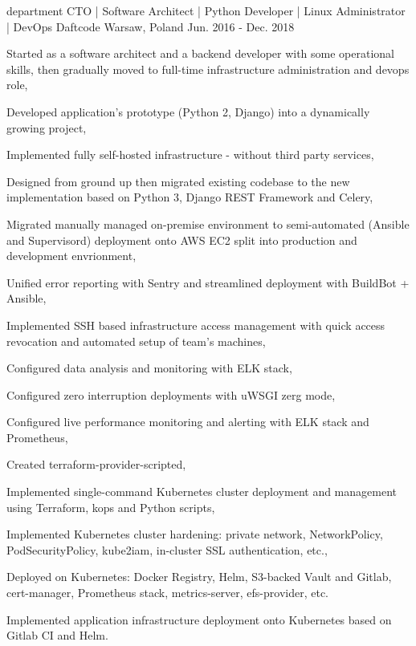 \begin{cventries}
    \cventry
    {department CTO | Software Architect | Python Developer | Linux Administrator | DevOps} %
    {Daftcode} %
    {Warsaw, Poland} %
    {Jun. 2016 - Dec. 2018} %
    {
        \begin{cvitems} %
            \item {Started as a software architect and a backend developer with some operational skills, then gradually moved to full-time infrastructure administration and devops role,}
            \item {Developed application's prototype (Python 2, Django) into a dynamically growing project,}
            \item {Implemented fully self-hosted infrastructure - without third party services,}
            \item {Designed from ground up then migrated existing codebase to the new implementation based on Python 3, Django REST Framework and Celery,}
            \item {Migrated manually managed on-premise environment to semi-automated (Ansible and Supervisord) deployment onto AWS EC2 split into production and development envrionment,}
            \item {Unified error reporting with Sentry and streamlined deployment with BuildBot + Ansible,}
            \item {Implemented SSH based infrastructure access management with quick access revocation and automated setup of team's machines,}
            \item {Configured data analysis and monitoring with ELK stack,}
            \item {Configured zero interruption deployments with uWSGI zerg mode,}
            \item {Configured live performance monitoring and alerting with ELK stack and Prometheus,}
            \item {Created terraform-provider-scripted,}
            \item {Implemented single-command Kubernetes cluster deployment and management using Terraform, kops and Python scripts,}
            \item {Implemented Kubernetes cluster hardening: private network, NetworkPolicy, PodSecurityPolicy, kube2iam, in-cluster SSL authentication, etc.,}
            \item {Deployed on Kubernetes: Docker Registry, Helm, S3-backed Vault and Gitlab, cert-manager, Prometheus stack, metrics-server, efs-provider, etc.}
            \item {Implemented application infrastructure deployment onto Kubernetes based on Gitlab CI and Helm.}
        \end{cvitems}
    }


\end{cventries}
